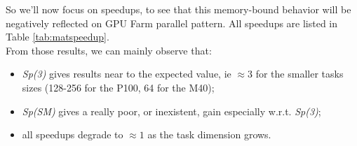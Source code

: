 So we'll now focus on speedups, to see that this memory-bound behavior will be negatively reflected on GPU Farm parallel pattern. All speedups are listed in Table \ref{tab:matspeedup}.\\
From those results, we can mainly observe that:
\begin{itemize}
	\item \textit{Sp(3)} gives results near to the expected value, ie \(\approx 3\) for the smaller tasks sizes (128-256 for the P100, 64 for the M40);
	
	\item \textit{Sp(SM)} gives a really poor, or inexistent, gain especially w.r.t. \textit{Sp(3)};
	
	\item all speedups degrade  to \(\approx1\) as the task dimension grows.
\end{itemize}
%
%
%

